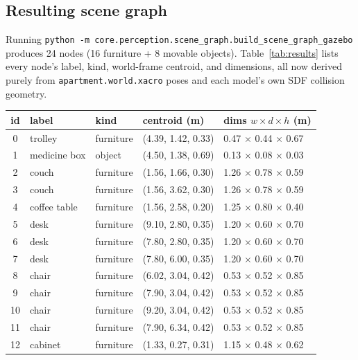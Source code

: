 \documentclass[11pt]{article}
\begin{document}
\subsection{Resulting scene graph}
\label{sec:results}

Running \texttt{python -m core.perception.scene\_graph.build\_scene\_graph\_gazebo}
produces 24 nodes (16 furniture + 8 movable objects). Table~\ref{tab:results}
lists every node's label, kind, world-frame centroid, and dimensions, all now
derived purely from \texttt{apartment.world.xacro} poses and each model's own
SDF collision geometry.

\begin{center}
\begin{longtable}{c l l l l}
\toprule
\textbf{id} & \textbf{label} & \textbf{kind} & \textbf{centroid (m)} & \textbf{dims $w{\times}d{\times}h$ (m)} \\
\midrule
\endhead
0  & trolley      & furniture & (4.39, 1.42, 0.33)  & 0.47 $\times$ 0.44 $\times$ 0.67 \\
1  & medicine box & object    & (4.50, 1.38, 0.69)  & 0.13 $\times$ 0.08 $\times$ 0.03 \\
2  & couch        & furniture & (1.56, 1.66, 0.30)  & 1.26 $\times$ 0.78 $\times$ 0.59 \\
3  & couch        & furniture & (1.56, 3.62, 0.30)  & 1.26 $\times$ 0.78 $\times$ 0.59 \\
4  & coffee table & furniture & (1.56, 2.58, 0.20)  & 1.25 $\times$ 0.80 $\times$ 0.40 \\
5  & desk         & furniture & (9.10, 2.80, 0.35)  & 1.20 $\times$ 0.60 $\times$ 0.70 \\
6  & desk         & furniture & (7.80, 2.80, 0.35)  & 1.20 $\times$ 0.60 $\times$ 0.70 \\
7  & desk         & furniture & (7.80, 6.00, 0.35)  & 1.20 $\times$ 0.60 $\times$ 0.70 \\
8  & chair        & furniture & (6.02, 3.04, 0.42)  & 0.53 $\times$ 0.52 $\times$ 0.85 \\
9  & chair        & furniture & (7.90, 3.04, 0.42)  & 0.53 $\times$ 0.52 $\times$ 0.85 \\
10 & chair        & furniture & (9.20, 3.04, 0.42)  & 0.53 $\times$ 0.52 $\times$ 0.85 \\
11 & chair        & furniture & (7.90, 6.34, 0.42)  & 0.53 $\times$ 0.52 $\times$ 0.85 \\
12 & cabinet      & furniture & (1.33, 0.27, 0.31)  & 1.15 $\times$ 0.48 $\times$ 0.62 \\

\end{longtable}
\end{center}
\end{document}
